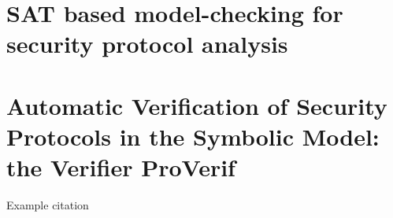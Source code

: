 \documentclass[a4paper,UKenglish]{lipics-v2018}
\begin{document}




\newpage
\section{SAT based model-checking for security protocol analysis}



\newpage
\section{Automatic Verification of Security Protocols in the Symbolic Model: the Verifier ProVerif}
Example citation \cite{ProVerif}




\end{document}
